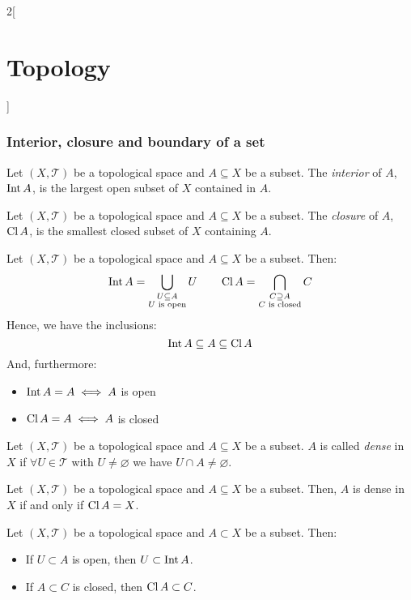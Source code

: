 \documentclass[../../../main.tex]{subfiles}
\begin{document}
\begin{multicols}{2}[\section{Topology}]
  \subsubsection{Interior, closure and boundary of a set}
  \begin{definition}[Interior]
    Let $(X,\mathcal{T})$ be a topological space and $A\subseteq X$ be a subset. The \textit{interior} of $A$, $\operatorname{Int} A$, is the largest open subset of $X$ contained in $A$.
  \end{definition}
  \begin{definition}[Closure]
    Let $(X,\mathcal{T})$ be a topological space and $A\subseteq X$ be a subset. The \textit{closure} of $A$, $\operatorname{Cl} A$, is the smallest closed subset of $X$ containing $A$.
  \end{definition}
  \begin{prop}
    Let $(X,\mathcal{T})$ be a topological space and $A\subseteq X$ be a subset. Then: $$\operatorname{Int} A=\bigcup_{\substack{U\subseteq A\\U\text{ is open}}}U\qquad\operatorname{Cl} A=\bigcap_{\substack{C\supseteq A\\C\text{ is closed}}}C$$
    Hence, we have the inclusions: $$\operatorname{Int} A\subseteq A\subseteq \operatorname{Cl} A$$
    And, furthermore:
    \begin{itemize}
      \item $\operatorname{Int} A=A\iff A$ is open
      \item $\operatorname{Cl} A=A\iff A$ is closed
    \end{itemize}
  \end{prop}
  \begin{definition}
    Let $(X,\mathcal{T})$ be a topological space and $A\subseteq X$ be a subset. $A$ is called \textit{dense} in $X$ if $\forall U\in\mathcal{T}$ with $U\ne\varnothing$ we have $U\cap A\ne\varnothing$.
  \end{definition}
  \begin{prop}
    Let $(X,\mathcal{T})$ be a topological space and $A\subseteq X$ be a subset. Then, $A$ is dense in $X$ if and only if $\operatorname{Cl} A=X$.
  \end{prop}
  \begin{prop}
    Let $(X,\mathcal{T})$ be a topological space and $A\subset X$ be a subset. Then:
    \begin{itemize}
      \item If $U\subset A$ is open, then $U\subset\operatorname{Int} A$.
      \item If $A\subset C$ is closed, then $\operatorname{Cl} A\subset C$.
    \end{itemize}

\end{prop}
\end{multicols}
\end{document}
